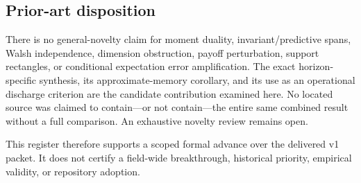 \documentclass[11pt,a4paper]{article}
\begin{document}
\subsection*{Prior-art disposition}\label{prior-art-disposition}

There is no general-novelty claim for moment duality,
invariant/predictive spans, Walsh independence, dimension obstruction,
payoff perturbation, support rectangles, or conditional expectation
error amplification. The exact horizon-specific synthesis, its
approximate-memory corollary, and its use as an operational discharge
criterion are the candidate contribution examined here. No located
source was claimed to contain---or not contain---the entire same
combined result without a full comparison. An exhaustive novelty review
remains open.

This register therefore supports a scoped formal advance over the
delivered v1 packet. It does not certify a field-wide breakthrough,
historical priority, empirical validity, or repository adoption.
\end{document}
